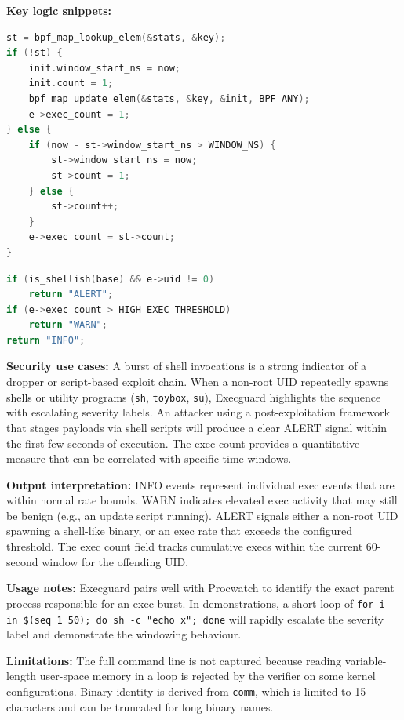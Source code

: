 \documentclass{mnitjaipur}
\begin{document}
\textbf{Key logic snippets:}
\begin{lstlisting}[language=C,caption={Execguard sliding window rate tracking}]
st = bpf_map_lookup_elem(&stats, &key);
if (!st) {
    init.window_start_ns = now;
    init.count = 1;
    bpf_map_update_elem(&stats, &key, &init, BPF_ANY);
    e->exec_count = 1;
} else {
    if (now - st->window_start_ns > WINDOW_NS) {
        st->window_start_ns = now;
        st->count = 1;
    } else {
        st->count++;
    }
    e->exec_count = st->count;
}
\end{lstlisting}

\begin{lstlisting}[language=C,caption={Execguard shell heuristic and severity labelling (user space)}]
if (is_shellish(base) && e->uid != 0)
    return "ALERT";
if (e->exec_count > HIGH_EXEC_THRESHOLD)
    return "WARN";
return "INFO";
\end{lstlisting}

\textbf{Security use cases:} A burst of shell invocations is a strong indicator of a dropper or script-based exploit chain. When a non-root UID repeatedly spawns shells or utility programs (\texttt{sh}, \texttt{toybox}, \texttt{su}), Execguard highlights the sequence with escalating severity labels. An attacker using a post-exploitation framework that stages payloads via shell scripts will produce a clear ALERT signal within the first few seconds of execution. The exec count provides a quantitative measure that can be correlated with specific time windows.

\textbf{Output interpretation:} INFO events represent individual exec events that are within normal rate bounds. WARN indicates elevated exec activity that may still be benign (e.g., an update script running). ALERT signals either a non-root UID spawning a shell-like binary, or an exec rate that exceeds the configured threshold. The exec count field tracks cumulative execs within the current 60-second window for the offending UID.

\textbf{Usage notes:} Execguard pairs well with Procwatch to identify the exact parent process responsible for an exec burst. In demonstrations, a short loop of \texttt{for i in \$(seq 1 50); do sh -c "echo x"; done} will rapidly escalate the severity label and demonstrate the windowing behaviour.

\textbf{Limitations:} The full command line is not captured because reading variable-length user-space memory in a loop is rejected by the verifier on some kernel configurations. Binary identity is derived from \texttt{comm}, which is limited to 15 characters and can be truncated for long binary names.
\end{document}
